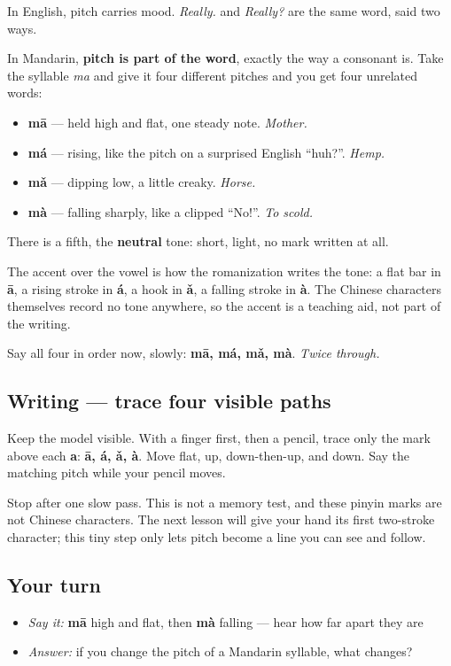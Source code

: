 \begin{sounds}
In English, pitch carries mood. \emph{Really.} and \emph{Really?} are the same word, said two ways.

In Mandarin, \textbf{pitch is part of the word}, exactly the way a consonant is. Take the syllable \emph{ma} and give it four different pitches and you get four unrelated words:

\begin{itemize}
\raggedright
  \item \textbf{mā} — held high and flat, one steady note. \emph{Mother.}
  \item \textbf{má} — rising, like the pitch on a surprised English \textquotedblleft{}huh?\textquotedblright{}. \emph{Hemp.}
  \item \textbf{mǎ} — dipping low, a little creaky. \emph{Horse.}
  \item \textbf{mà} — falling sharply, like a clipped \textquotedblleft{}No!\textquotedblright{}. \emph{To scold.}
\end{itemize}

There is a fifth, the \textbf{neutral} tone: short, light, no mark written at all.

The accent over the vowel is how the romanization writes the tone: a flat bar in \textbf{ā}, a rising stroke in \textbf{á}, a hook in \textbf{ǎ}, a falling stroke in \textbf{à}. The Chinese characters themselves record no tone anywhere, so the accent is a teaching aid, not part of the writing.

Say all four in order now, slowly: \textbf{mā, má, mǎ, mà}. \emph{Twice through.}
\end{sounds}

\subsection*{Writing — trace four visible paths}
Keep the model visible. With a finger first, then a pencil, trace only the mark above each \textbf{a}: \textbf{ā, á, ǎ, à}. Move flat, up, down-then-up, and down. Say the matching pitch while your pencil moves.

Stop after one slow pass. This is not a memory test, and these pinyin marks are not Chinese characters. The next lesson will give your hand its first two-stroke character; this tiny step only lets pitch become a line you can see and follow.

\subsection*{Your turn}
\begin{itemize}
\raggedright
  \item \emph{Say it:} \textbf{mā} high and flat, then \textbf{mà} falling — hear how far apart they are
  \item \emph{Answer:} if you change the pitch of a Mandarin syllable, what changes?
\end{itemize}


